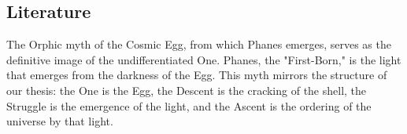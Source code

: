 \subsection{Literature}
The Orphic myth of the Cosmic Egg, from which Phanes emerges, serves as the definitive image of the undifferentiated One. Phanes, the "First-Born," is the light that emerges from the darkness of the Egg. This myth mirrors the structure of our thesis: the One is the Egg, the Descent is the cracking of the shell, the Struggle is the emergence of the light, and the Ascent is the ordering of the universe by that light.
